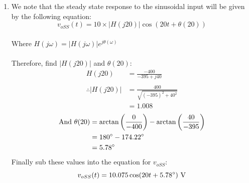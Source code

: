 \begin{enumerate}
	\item{
		We note that the steady state response to the sinusoidal input will be given by the following equation:
		\begin{equation*}
			v_{oSS}(t) = 10 \times |H(j20)| \cos(20t + \theta(20))
		\end{equation*}
		\\
		Where $H(j\omega) = |H(j\omega)|e^{j\theta(\omega)}$
		\\ \\
		Therefore, find $|H(j20)|$ and $\theta(20)$:
		\begin{align*}
			H(j20) &= \frac{-400}{-395+j40} \\
			\\
			\therefore |H(j20)| &= \frac{400}{\sqrt{(-395)^2+40^2}} \\
			&= 1.008
		\end{align*}
		\begin{align*}
			\mathrm{And} \ \theta(20) &= \arctan \left(\frac{0}{-400} \right) - \arctan \left(\frac{40}{-395} \right) \\
			&= 180\degree - 174.22\degree \\
			&= 5.78\degree
		\end{align*}
		Finally sub these values into the equation for $v_{oSS}$:
		\begin{equation*}
			v_{oSS}(t) = 10.075 \cos(20t+5.78\degree) \ \mathrm{V}
		\end{equation*}
		\\
	}

\end{enumerate}

